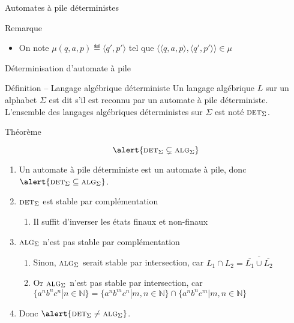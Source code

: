 \begin{frame}{Automates à pile déterministes}
  \vspace{-2mm}
  \begin{alertblock}{Remarque}
    \begin{itemize}
    \item \vspace{-1mm} On note $\mu(q, a, p) \eqdef \langle q', p'\rangle$ tel que $\langle \langle q, a, p\rangle, \langle q', p'\rangle \rangle \in \mu$
    \end{itemize}
  \end{alertblock}
\end{frame}

\begin{frame}{Déterminisation d'automate à pile}
  \small 
  \begin{block}{Définition -- Langage algébrique déterministe}
    Un langage algébrique $L$ sur un alphabet $\Sigma$ est dit  s'il est reconnu par un automate à pile déterministe.
    L'ensemble des langages algébriques déterministes sur $\Sigma$ est noté $\textsc{det}_\Sigma$.
  \end{block}
  
  \begin{block}{Théorème}
    
    \vspace{-4mm}
    $$\alert{\textsc{det}_\Sigma \subsetneq \textsc{alg}_\Sigma}$$

    \vspace{-1mm}
    \begin{enumerate}
    \item Un automate à pile déterministe est un automate à pile, donc $\alert{\textsc{det}_\Sigma \subseteq \textsc{alg}_\Sigma}$.
    \item $\textsc{det}_\Sigma$ est stable par complémentation
      \begin{enumerate}
      \item Il suffit d'inverser les états finaux et non-finaux
      \end{enumerate}
    \item $\textsc{alg}_\Sigma$ n'est pas stable par complémentation
      \begin{enumerate}
      \item Sinon, $\textsc{alg}_\Sigma$ serait stable par intersection, car $L_1 \cap L_2 = \overline{\overline{L_1} \cup \overline{L_2}}$
      \item Or $\textsc{alg}_\Sigma$ n'est pas stable par intersection, car $\{a^n b^n c^n | n\in \mathbb{N}\} = \{a^n b^m c^n | m, n\in \mathbb{N}\} \cap \{a^n b^n c^m | m, n\in \mathbb{N}\}$
      \end{enumerate}
    \item Donc $\alert{\textsc{det}_\Sigma \neq \textsc{alg}_\Sigma}$.
    \end{enumerate}
  \end{block}
\end{frame}

